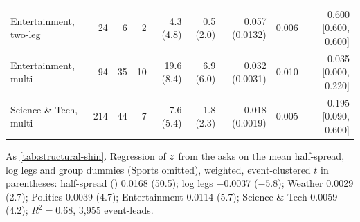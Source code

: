 \begin{table}[!htbp]
\begin{threeparttable}
\begin{tabular}{@{}lrrrrrrrr@{}}
\quad Entertainment, two-leg & 24 & 6 & 2 & 4.3 (4.8) & 0.5 (2.0) & 0.057 (0.0132) & 0.006 & 0.600 [0.600, 0.600] \\
\quad Entertainment, multi & 94 & 35 & 10 & 19.6 (8.4) & 6.9 (6.0) & 0.032 (0.0031) & 0.010 & 0.035 [0.000, 0.220] \\
\quad Science \& Tech, multi & 214 & 44 & 7 & 7.6 (5.4) & 1.8 (2.3) & 0.018 (0.0019) & 0.005 & 0.195 [0.090, 0.600] \\
\bottomrule
\end{tabular}
\begin{tablenotes}\footnotesize
\item As \cref{tab:structural-shin}. Regression of $z$ from the asks on the mean half-spread, log legs and group dummies (Sports omitted), weighted, event-clustered $t$ in parentheses: half-spread (\cents) 0.0168 (50.5); log legs $-$0.0037 ($-$5.8); Weather 0.0029 (2.7); Politics 0.0039 (4.7); Entertainment 0.0114 (5.7); Science \& Tech 0.0059 (4.2); $R^2=0.68$, 3{,}955 event-leads.
\end{tablenotes}
\end{threeparttable}
\end{table}

